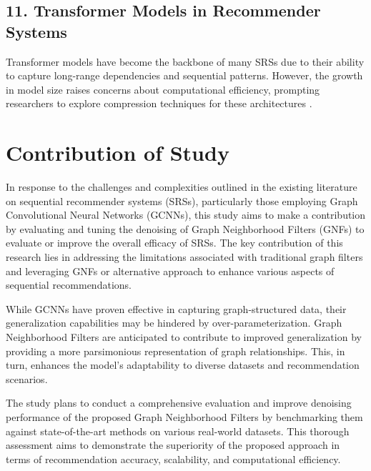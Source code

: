 \documentclass[journal]{IEEEtran}
\begin{document}
\subsection*{11. Transformer Models in Recommender Systems}

Transformer models have become the backbone of many SRSs due to their ability to capture long-range dependencies and sequential 
patterns. However, the growth in model size raises concerns about computational efficiency, prompting researchers to explore 
compression techniques for these architectures \cite{LI2024122260}.





\section{Contribution of Study}

In response to the challenges and complexities outlined in the existing literature on sequential recommender systems (SRSs), 
particularly those employing Graph Convolutional Neural Networks (GCNNs), this study aims to make a contribution by 
evaluating and tuning the denoising of Graph Neighborhood Filters (GNFs) \cite{tenorio2021robust} \cite{FENG2022113} to evaluate or 
improve the overall efficacy of SRSs. The key contribution of this research lies in addressing the limitations associated with traditional 
graph filters and leveraging GNFs or alternative approach to enhance various aspects of sequential recommendations.

While GCNNs have proven effective in capturing graph-structured data, their generalization capabilities may be hindered by 
over-parameterization. Graph Neighborhood Filters are anticipated to contribute to improved generalization by providing a more 
parsimonious representation of graph relationships. This, in turn, enhances the model's adaptability to diverse datasets and 
recommendation scenarios.

The study plans to conduct a comprehensive evaluation and improve denoising performance of the proposed Graph Neighborhood 
Filters by benchmarking them against state-of-the-art methods on various real-world datasets. This thorough assessment aims 
to demonstrate the superiority of the proposed approach in terms of recommendation accuracy, scalability, and computational efficiency.
\end{document}
